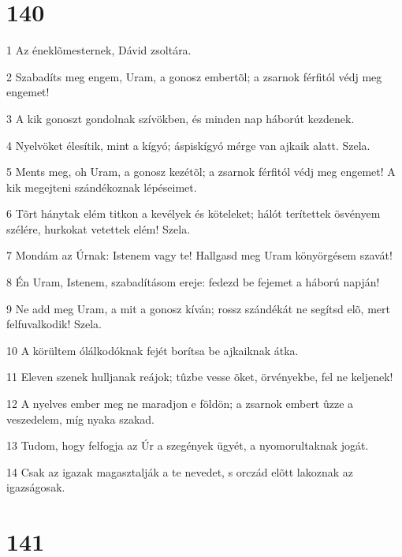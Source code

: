 \chapter{140}

\par 1 Az éneklõmesternek, Dávid zsoltára.
\par 2 Szabadíts meg engem, Uram, a gonosz embertõl; a zsarnok férfitól védj meg engemet!
\par 3 A kik gonoszt gondolnak szívökben, és minden nap háborút kezdenek.
\par 4 Nyelvöket élesítik, mint a kígyó; áspiskígyó mérge van ajkaik alatt. Szela.
\par 5 Ments meg, oh Uram, a gonosz kezétõl; a zsarnok férfitól védj meg engemet! A kik megejteni szándékoznak lépéseimet.
\par 6 Tõrt hánytak elém titkon a kevélyek és köteleket; hálót terítettek ösvényem szélére, hurkokat vetettek elém! Szela.
\par 7 Mondám az Úrnak: Istenem vagy te! Hallgasd meg Uram könyörgésem szavát!
\par 8 Én Uram, Istenem, szabadításom ereje: fedezd be fejemet a háború napján!
\par 9 Ne add meg Uram, a mit a gonosz kíván; rossz szándékát ne segítsd elõ, mert felfuvalkodik! Szela.
\par 10 A körültem ólálkodóknak fejét borítsa be ajkaiknak átka.
\par 11 Eleven szenek hulljanak reájok; tûzbe vesse õket, örvényekbe, fel ne keljenek!
\par 12 A nyelves ember meg ne maradjon e földön; a zsarnok embert ûzze a veszedelem, míg nyaka szakad.
\par 13 Tudom, hogy felfogja az Úr a szegények ügyét, a nyomorultaknak jogát.
\par 14 Csak az igazak magasztalják a te nevedet, s orczád elõtt lakoznak az igazságosak.

\chapter{141}

